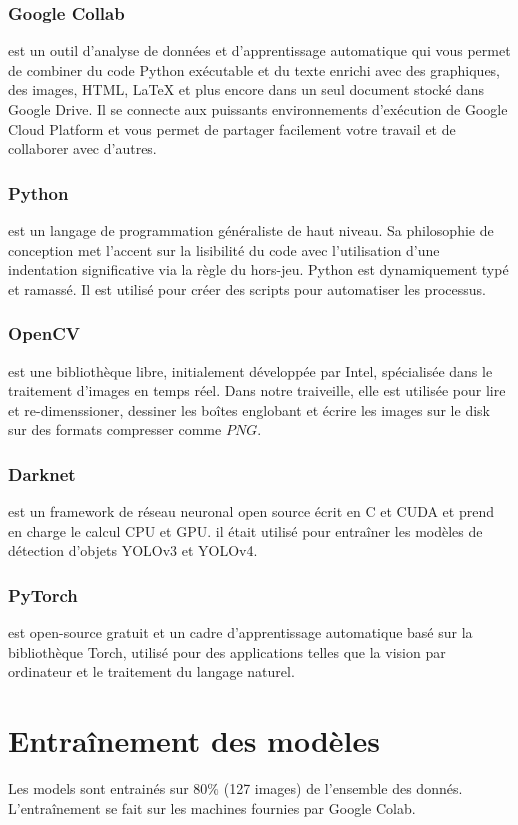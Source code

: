      \subsubsection{Google Collab} est un outil d'analyse de données et d'apprentissage automatique qui vous permet de combiner du code Python exécutable et du texte enrichi avec des graphiques, des images, HTML, LaTeX et plus encore dans un seul document stocké dans Google Drive. Il se connecte aux puissants environnements d'exécution de Google Cloud Platform et vous permet de partager facilement votre travail et de collaborer avec d'autres.
     \subsubsection{Python} est un langage de programmation généraliste de haut niveau. Sa philosophie de conception met l'accent sur la lisibilité du code avec l'utilisation d'une indentation significative via la règle du hors-jeu. Python est dynamiquement typé et ramassé. Il est utilisé pour créer des scripts pour automatiser les processus. 
     \subsubsection{OpenCV} est une bibliothèque libre, initialement développée par Intel, spécialisée dans le traitement d'images en temps réel. Dans notre traiveille, elle est utilisée pour lire et re-dimenssioner, dessiner les boîtes englobant et écrire les images sur le disk sur des formats compresser comme $PNG$.
     \subsubsection{Darknet} est un framework de réseau neuronal open source écrit en C et CUDA et prend en charge le calcul CPU et GPU. il était utilisé pour entraîner les modèles de détection d'objets YOLOv3 et YOLOv4.
     \subsubsection{PyTorch} est open-source gratuit et un cadre d'apprentissage automatique basé sur la bibliothèque Torch, utilisé pour des applications telles que la vision par ordinateur et le traitement du langage naturel.

\section{Entraînement des modèles}
     Les models sont entrainés sur $80\%$ (127 images) de l'ensemble des donnés. L'entraînement se fait sur les machines fournies par Google Colab.

